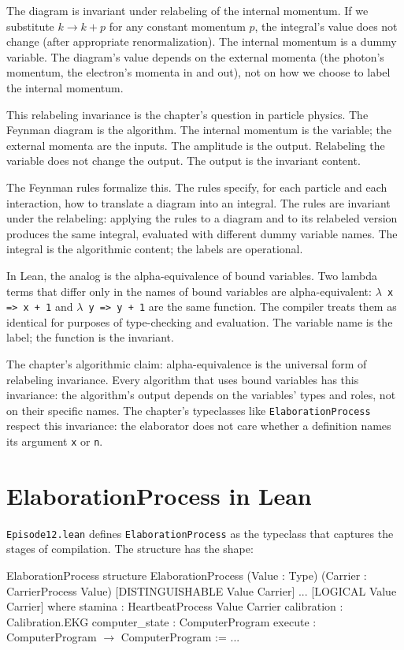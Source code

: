 The diagram is invariant under relabeling of the internal momentum.
If we substitute $k \to k + p$ for any constant momentum $p$, the
integral's value does not change (after appropriate
renormalization). The internal momentum is a dummy variable. The
diagram's value depends on the external momenta (the photon's
momentum, the electron's momenta in and out), not on how we choose
to label the internal momentum.

This relabeling invariance is the chapter's question in particle
physics. The Feynman diagram is the algorithm. The internal
momentum is the variable; the external momenta are the inputs. The
amplitude is the output. Relabeling the variable does not change
the output. The output is the invariant content.

The Feynman rules formalize this. The rules specify, for each
particle and each interaction, how to translate a diagram into an
integral. The rules are invariant under the relabeling: applying
the rules to a diagram and to its relabeled version produces the
same integral, evaluated with different dummy variable names. The
integral is the algorithmic content; the labels are operational.

In Lean, the analog is the alpha-equivalence of bound variables.
Two lambda terms that differ only in the names of bound variables
are alpha-equivalent: \texttt{$\lambda$ x => x + 1} and
\texttt{$\lambda$ y => y + 1} are the same function. The compiler
treats them as identical for purposes of type-checking and
evaluation. The variable name is the label; the function is the
invariant.

The chapter's algorithmic claim: alpha-equivalence is the universal
form of relabeling invariance. Every algorithm that uses bound
variables has this invariance: the algorithm's output depends on
the variables' types and roles, not on their specific names. The
chapter's typeclasses like \texttt{ElaborationProcess} respect this
invariance: the elaborator does not care whether a definition
names its argument \texttt{x} or \texttt{n}.

\section{ElaborationProcess in Lean}
\label{se:elaborationprocess-in-lean}

\texttt{Episode12.lean} defines \texttt{ElaborationProcess} as the
typeclass that captures the stages of compilation. The structure
has the shape:

\begin{leanexcerpt}{ElaborationProcess}
structure ElaborationProcess
    (Value : Type)
    (Carrier : CarrierProcess Value)
    [DISTINGUISHABLE Value Carrier] ... [LOGICAL Value Carrier]
  where
  stamina        : HeartbeatProcess Value Carrier
  calibration    : Calibration.EKG
  computer_state : ComputerProgram
  execute        : ComputerProgram $\to$ ComputerProgram := ...
\end{leanexcerpt}

